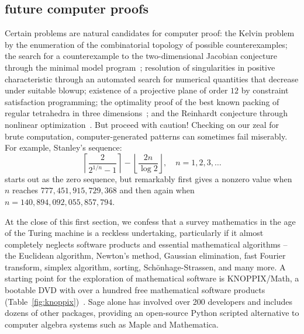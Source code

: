 \documentclass{llncs}
\begin{document}
\subsection{future computer proofs}

Certain problems are natural candidates for computer proof: the Kelvin
problem by the enumeration of the combinatorial topology of possible
counterexamples; the search for a counterexample to the
two-dimensional Jacobian conjecture through the minimal model
program~\cite{Borisov}; resolution of singularities in positive
characteristic through an automated search for numerical quantities
that decrease under suitable blowup; existence of a projective plane
of order $12$ by constraint satisfaction programming; the optimality
proof of the best known packing of regular tetrahedra in three
dimensions~\cite{Chen-2010}; and the Reinhardt conjecture through
nonlinear optimization~\cite{HR11}.  But proceed with caution!
Checking on our zeal for brute computation, computer-generated
patterns can sometimes fail miserably.  For example, Stanley's
sequence:
\[
\left\lceil{\frac{2}{2^{1/n} - 1}}\right\rceil- 
\left\lfloor{\frac{2 n}{\log 2}}\right\rfloor,\quad n=1,2,3,\ldots
\]
starts out as the zero sequence, but remarkably first gives a nonzero
value when $n$ reaches $777,451,915,729,368$ and then again when
$n=140,894,092,055,857,794$.

\smallskip At the close of this first section, we confess that a
survey mathematics in the age of the Turing machine is a reckless
undertaking, particularly if it almost completely neglects software
products and essential mathematical algorithms -- the Euclidean
algorithm, Newton's method, Gaussian elimination, fast Fourier
transform, simplex algorithm, sorting, Sch\"onhage-Strassen, and many
more.  A starting point for the exploration of mathematical software
is KNOPPIX/Math, a bootable DVD with over a hundred free mathematical
software products (Table~\ref{fig:knoppix})~\cite{HK08}.  Sage alone
has involved over 200 developers and includes dozens of other
packages, providing an open-source Python scripted alternative to
computer algebra systems such as Maple and Mathematica.
\end{document}

